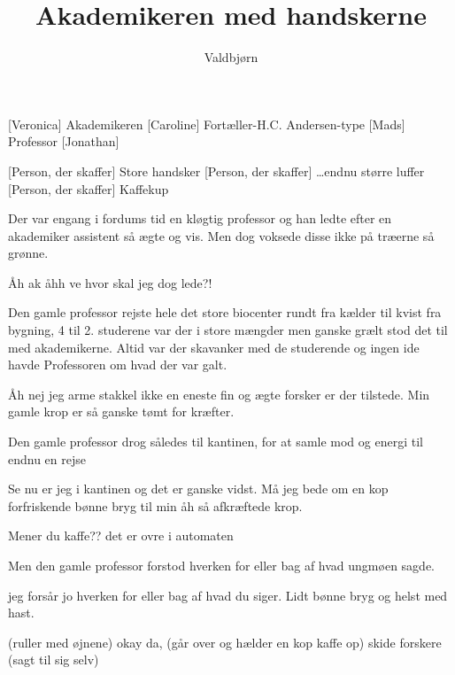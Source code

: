 \documentclass[a4paper,11pt]{article}
\title{Akademikeren med handskerne}
\author{Valdbjørn}
\begin{document}
\maketitle

\begin{roles}
    [Veronica] Akademikeren
    [Caroline] Fortæller-H.C. Andersen-type
    [Mads] Professor
    [Jonathan]
\end{roles}

\begin{props}
    [Person, der skaffer] Store handsker
    [Person, der skaffer] \ldots endnu større luffer
    [Person, der skaffer] Kaffekup
\end{props}


\begin{sketch}


 Der var engang i fordums tid en kløgtig professor og han ledte efter en akademiker assistent så ægte og vis. Men dog voksede disse ikke på træerne så grønne.

 Åh ak åhh ve hvor skal jeg dog lede?!

 Den gamle professor rejste hele det store biocenter rundt fra kælder til kvist fra bygning, 4 til 2. studerene var der i store mængder men ganske grælt stod det til med akademikerne. Altid var der skavanker med de studerende og ingen ide havde Professoren om hvad der var galt.

 Åh nej jeg arme stakkel ikke en eneste fin og ægte forsker er der tilstede. Min gamle krop er så ganske tømt for kræfter.

 Den gamle professor drog således til kantinen, for at samle mod og energi til endnu en rejse

 Se nu er jeg i kantinen og det er ganske vidst. Må jeg bede om en kop forfriskende bønne bryg til min åh så afkræftede krop.

 Mener du kaffe?? det er ovre i automaten

 Men den gamle professor forstod hverken for eller bag af hvad ungmøen sagde.

 jeg forsår jo hverken for eller bag af hvad du siger. Lidt bønne bryg og helst med hast.

 (ruller med øjnene) okay da, (går over og hælder en kop kaffe op) skide forskere (sagt til sig selv)


\end{sketch}
\end{document}
